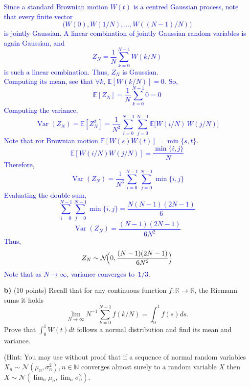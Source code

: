 \documentclass{article}
\begin{document}
\textcolor{blue}{
Since a standard Brownian motion $W(t)$ is a centred Gaussian process, note that every finite vector  
$$
\bigl(W(0),W(1/N),\dots,W((N-1)/N)\bigr)
$$
is jointly Gaussian. A linear combination of jointly Gaussian random variables is again Gaussian, and  
$$
Z_N=\frac1N\sum_{k=0}^{N-1}W(k/N)
$$
is such a linear combination. Thus, $Z_N$ is Gaussian. \\
Computing its mean, see that $\forall k$, $\mathbb{E}[W(k/N)]=0$. So,
$$
\mathbb{E}[Z_N]=\frac1N\sum_{k=0}^{N-1}0=0
$$
Computing the variance,
$$
\operatorname{Var}(Z_N)=\mathbb{E}[Z_N^2]=\frac1{N^{2}}\sum_{i=0}^{N-1}\sum_{j=0}^{N-1}\mathbb{E}\!\bigl[W(i/N)\,W(j/N)\bigr]
$$
Note that ror Brownian motion $\mathbb{E}[W(s)W(t)]=\min\{s,t\}$.
$$
\mathbb{E}[W(i/N)W(j/N)]=\frac{\min\{i,j\}}N
$$
Therefore,
$$
\operatorname{Var}(Z_N)=\frac1{N^{3}}\sum_{i=0}^{N-1}\sum_{j=0}^{N-1}\min\{i,j\}
$$
Evaluating the double sum,
$$
\sum_{i=0}^{N-1}\sum_{j=0}^{N-1}\min\{i,j\}=\frac{N(N-1)(2N-1)}6
$$
$$
\operatorname{Var}(Z_N)=\frac{(N-1)(2N-1)}{6N^{2}}
$$
Thus,
$$
Z_N\sim\mathcal{N}\!\Bigl(0,\frac{(N-1)(2N-1)}{6N^{2}}\Bigr)
$$
Note that 
as $N\to\infty$, variance converges to $1/3$.
}


\textbf{b)}   (10 points) Recall that for any continuous function 
$f : \mathbb{R} \rightarrow \mathbb{R}$, the Riemann sums it holds
$$\lim_{N \rightarrow \infty} N^{-1} \sum_{k=0}^{N-1} f(k/N) = \int_0^1 f(s)ds.$$
Prove that 
$\int_0^1 W(t)dt$ 
follows a normal distribution and find its mean and variance.

(Hint: You may use without proof that if a sequence of normal random variables $X_n \sim \mathcal{N}(\mu_n, \sigma_n^2), n \in \mathbb{N}$ converges almost surely to a random variable $X$ then 
$X \sim \mathcal{N}(\lim_n \mu_n, \lim_n \sigma_n^2).$
\end{document}
